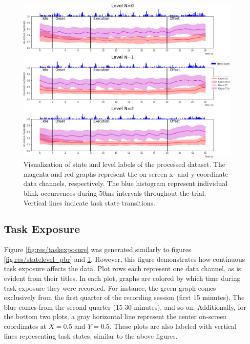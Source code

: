 \begin{figure}[h]
    \centering
    \includegraphics[width=\textwidth]{figures/impl_statelevelvisualization_xy.png}
    \caption{Visualization of state and level labels of the processed dataset. The magenta and red graphs represent the on-screen x- and y-coordinate data channels, respectively. The blue histogram represent individual blink occurrences during 50ms intervals throughout the trial. Vertical lines indicate task state transitions.}
    \label{fig:res/statelevel_xy}
\end{figure}

\subsection{Task Exposure}

Figure \ref{fig:res/taskexposure} was generated similarly to figures \ref{fig:res/statelevel_pbr} and \ref{fig:res/statelevel_xy}. However, this figure demonstrates how continuous task exposure affects the data. Plot rows each represent one data channel, as is evident from their titles. In each plot, graphs are colored by which time during task exposure they were recorded. For instance, the green graph comes exclusively from the first quarter of the recording session (first 15 minutes). The blue comes from the second quarter (15-30 minutes), and so on. Additionally, for the bottom two plots, a gray horizontal line represent the center on-screen coordinates at $X = 0.5$ and $Y = 0.5$. These plots are also labeled with vertical lines representing task states, similar to the above figures.

